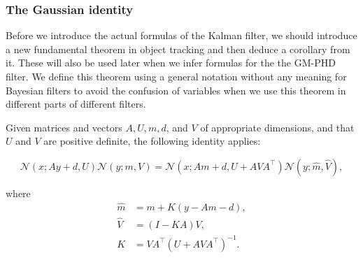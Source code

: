 \subsubsection{The Gaussian identity}

Before we introduce the actual formulas of the Kalman filter, we should introduce a new fundamental theorem in object tracking and then deduce a corollary from it. These will also be used later when we infer formulas for the the GM-PHD filter. We define this theorem using a general notation without any meaning for Bayesian filters to avoid the confusion of variables when we use this theorem in different parts of different filters.

\begin{theorem}\label{theorem:gaussian-identity}
    Given matrices and vectors $A, U, m, d$, and $V$ of appropriate dimensions, and that $U$ and $V$ are positive definite, the following identity applies:

    \begin{equation}\label{eq:gid}
        \mathscr{N}(x ; A y + d, U) \mathscr{N}(y ; m, V)=\mathscr{N}(x ; A m + d, U + A V A^\intercal) \mathscr{N}(y ; \hat{m}, \hat{V}),
    \end{equation}

    where
    \begin{align}
        \hat{m} & = m + K (y - Am - d), \\ 
        \hat{V} & = (I - K A) V, \\
        K &= V A^\intercal (U + A V A^\intercal)^{-1}.
    \end{align}
\end{theorem}

